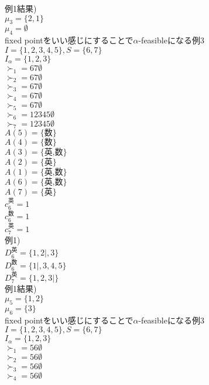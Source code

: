 \documentclass[a4j,10pt]{jsarticle}
\theoremstyle{definition}
\theoremstyle{remark}
\theoremstyle{plain}
\begin{document}
\begin{tcolorbox}[enhanced,breakable=true]
例1結果)\\
$\mu_3 = \{2,1\}$\\
$\mu_4 = \emptyset$\\



fixed pointをいい感じにすることで$\alpha$-feasibleになる例3\\
$I = \{1,2,3,4,5\}, S = \{6,7\}$\\
$I_\alpha = \{1,2,3\}$\\
$\succ_1 = 67\emptyset$\\
$\succ_2 = 67\emptyset$\\
$\succ_3 = 67\emptyset$\\
$\succ_4 = 67\emptyset$\\
$\succ_5 = 67\emptyset$\\
$\succ_6 = 12345\emptyset$\\
$\succ_7 = 12345\emptyset$\\


$A(5) = \{\text{数}\}$\\
$A(4) = \{\text{数}\}$\\
$A(3) = \{\text{英,数}\}$\\
$A(2) = \{\text{英}\}$\\
$A(1) = \{\text{英,数}\}$\\


$A(6) = \{\text{英,数}\}$\\
$A(7) = \{\text{英}\}$\\

$c_6^{\text{英}} = 1$\\
$c_6^{\text{数}} = 1$\\
$c_7^{\text{英}} = 1$\\

例1)\\
$D_6^{\text{英}} = \{1,2|,3\}$\\
$D_6^{\text{数}} = \{1|,3,4,5\}$\\
$D_7^{\text{英}} = \{1,2,3|\}$\\

例1結果)\\
$\mu_5 = \{1,2\}$\\
$\mu_6 = \{3\}$\\


fixed pointをいい感じにすることで$\alpha$-feasibleになる例3\\
$I = \{1,2,3,4,5\}, S = \{6,7\}$\\
$I_\alpha = \{1,2,3\}$\\
$\succ_1 = 56\emptyset$\\
$\succ_2 = 56\emptyset$\\
$\succ_3 = 56\emptyset$\\
$\succ_4 = 56\emptyset$\\



\end{tcolorbox}
\end{document}
